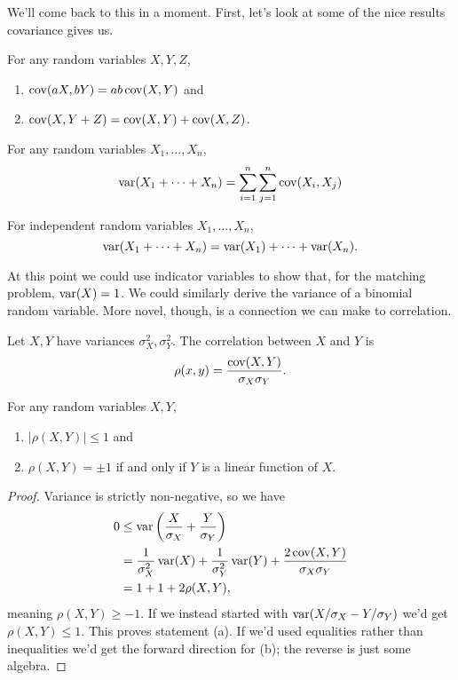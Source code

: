 \documentclass[../m157main.tex]{subfiles}
\begin{document}
We'll come back to this in a moment.
First, let's look at some of the nice results covariance gives us.

\begin{theorem}
    For any random variables $X,Y,Z$,
    \begin{enumerate}[label=(\alph*)]
        \item $\operatorname{cov}(aX, bY) = ab \operatorname{cov}(X,Y)$ and
        \item $\operatorname{cov} (X, Y+Z) = \operatorname{cov}(X,Y) + \operatorname{cov}(X,Z)$.
    \end{enumerate}
\end{theorem}

\begin{theorem}
    For any random variables $X_1, \ldots, X_n$,    \vspace{-6pt}
    \[ \operatorname{var} (X_1 + \cdots + X_n) = \sum_{i=1}^{n} \sum_{j=1}^{n} \operatorname{cov}(X_i, X_j) \]
\end{theorem}

\begin{corollary}[]
    For independent random variables $X_1, \ldots, X_n$,
    \[ \operatorname{var}(X_1 + \cdots + X_n) = \operatorname{var}(X_1) + \cdots + \operatorname{var}(X_n). \]
\end{corollary}

At this point we could use indicator variables to show that, for the matching problem, $\operatorname{var}(X) = 1$.
We could similarly derive the variance of a binomial random variable.
More novel, though, is a connection we can make to correlation.

\begin{definition}[Correlation]
    Let $X,Y$ have variances $\sigma_X^2,\sigma_Y^2$.
    The correlation between $X$ and $Y$ is
    \[ \rho(x,y) = \frac{\operatorname{cov}(X,Y)}{\sigma_X \sigma_Y}. \]
\end{definition}

\begin{theorem}
    For any random variables $X,Y$,
    \begin{enumerate}[label=(\alph*)]
        \item $|\rho(X,Y)| \leq 1$ and
        \item $\rho(X,Y) = \pm 1$ if and only if $Y$ is a linear function of $X$.
    \end{enumerate}
\end{theorem}

\begin{proof}
    Variance is strictly non-negative, so we have
    \begin{align*}
        0 &\leq \operatorname{var} \left( \frac{X}{\sigma_X} + \frac{Y}{\sigma_Y} \right) \\
        &= \frac{1}{\sigma_X^2} \operatorname{var}(X) + \frac{1}{\sigma_Y^2} \operatorname{var}(Y) + \frac{2 \operatorname{cov}(X,Y)}{\sigma_X \sigma_Y} \\
        &= 1 + 1 + 2\rho(X,Y),
    \end{align*}
    meaning $\rho(X,Y) \geq -1$.
    If we instead started with $\operatorname{var}(X / \sigma_X - Y / \sigma_Y)$ we'd get $\rho(X,Y) \leq 1$.
    This proves statement (a).
    If we'd used equalities rather than inequalities we'd get the forward direction for (b); the reverse is just some algebra.
\end{proof}
\end{document}
